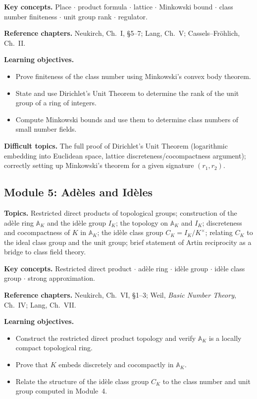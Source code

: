 \documentclass[11pt]{article}
\begin{document}
\textbf{Key concepts.} Place $\cdot$ product formula $\cdot$ lattice $\cdot$ Minkowski bound $\cdot$ class number finiteness $\cdot$ unit group rank $\cdot$ regulator.

\textbf{Reference chapters.} Neukirch, Ch.~I, \S5--7; Lang, Ch.~V; Cassels--Fröhlich, Ch.~II.

\textbf{Learning objectives.}
\begin{itemize}[leftmargin=*]
  \item Prove finiteness of the class number using Minkowski's convex body theorem.
  \item State and use Dirichlet's Unit Theorem to determine the rank of the unit group of a ring of integers.
  \item Compute Minkowski bounds and use them to determine class numbers of small number fields.
\end{itemize}

\textbf{Difficult topics.} The full proof of Dirichlet's Unit Theorem (logarithmic embedding into Euclidean space, lattice discreteness/cocompactness argument); correctly setting up Minkowski's theorem for a given signature $(r_1, r_2)$.

\subsection*{Module 5: Adèles and Idèles}
\textbf{Topics.} Restricted direct products of topological groups; construction of the adèle ring $\mathbb{A}_K$ and the idèle group $I_K$; the topology on $\mathbb{A}_K$ and $I_K$; discreteness and cocompactness of $K$ in $\mathbb{A}_K$; the idèle class group $C_K = I_K/K^\times$; relating $C_K$ to the ideal class group and the unit group; brief statement of Artin reciprocity as a bridge to class field theory.

\textbf{Key concepts.} Restricted direct product $\cdot$ adèle ring $\cdot$ idèle group $\cdot$ idèle class group $\cdot$ strong approximation.

\textbf{Reference chapters.} Neukirch, Ch.~VI, \S1--3; Weil, \emph{Basic Number Theory}, Ch.~IV; Lang, Ch.~VII.

\textbf{Learning objectives.}
\begin{itemize}[leftmargin=*]
  \item Construct the restricted direct product topology and verify $\mathbb{A}_K$ is a locally compact topological ring.
  \item Prove that $K$ embeds discretely and cocompactly in $\mathbb{A}_K$.
  \item Relate the structure of the idèle class group $C_K$ to the class number and unit group computed in Module~4.
\end{itemize}
\end{document}
